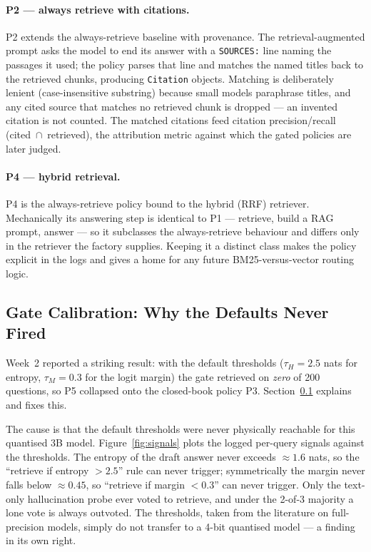 \paragraph{P2 --- always retrieve with citations.} P2 extends the always-retrieve
baseline with provenance. The retrieval-augmented prompt asks the model to end its
answer with a \texttt{SOURCES:} line naming the passages it used; the policy parses
that line and matches the named titles back to the retrieved chunks, producing
\texttt{Citation} objects. Matching is deliberately lenient (case-insensitive
substring) because small models paraphrase titles, and any cited source that
matches no retrieved chunk is dropped --- an invented citation is not counted.
The matched citations feed citation precision/recall (cited~$\cap$~retrieved),
the attribution metric against which the gated policies are later judged.

\paragraph{P4 --- hybrid retrieval.} P4 is the always-retrieve policy bound to the
hybrid (RRF) retriever. Mechanically its answering step is identical to P1 ---
retrieve, build a RAG prompt, answer --- so it subclasses the always-retrieve
behaviour and differs only in the retriever the factory supplies. Keeping it a
distinct class makes the policy explicit in the logs and gives a home for any
future BM25-versus-vector routing logic.

\subsection{Gate Calibration: Why the Defaults Never Fired}
\label{sec:calibration}

Week~2 reported a striking result: with the default thresholds
($\tau_H = 2.5$ nats for entropy, $\tau_M = 0.3$ for the logit margin) the gate
retrieved on \emph{zero} of 200 questions, so P5 collapsed onto the closed-book
policy P3. Section~\ref{sec:calibration} explains and fixes this.

The cause is that the default thresholds were never physically reachable for this
quantised 3B model. Figure~\ref{fig:signals} plots the logged per-query signals
against the thresholds. The entropy of the draft answer never exceeds
$\approx 1.6$ nats, so the ``retrieve if entropy $> 2.5$'' rule can never trigger;
symmetrically the margin never falls below $\approx 0.45$, so ``retrieve if
margin $< 0.3$'' can never trigger. Only the text-only hallucination probe ever
voted to retrieve, and under the 2-of-3 majority a lone vote is always outvoted.
The thresholds, taken from the literature on full-precision models, simply do not
transfer to a 4-bit quantised model --- a finding in its own right.

